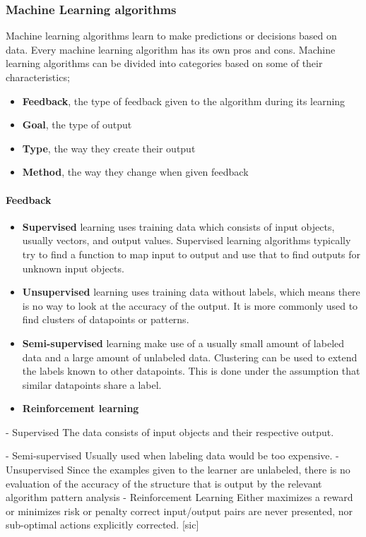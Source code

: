 \subsubsection{Machine Learning algorithms}
Machine learning algorithms learn to make predictions or decisions based on data. Every machine learning algorithm has its own pros and cons. Machine learning algorithms can be divided into categories based on some of their characteristics;
\begin{itemize}
	\item \textbf{Feedback}, the type of feedback given to the algorithm during its learning
	\item \textbf{Goal}, the type of output
	\item \textbf{Type}, the way they create their output
	\item \textbf{Method}, the way they change when given feedback
\end{itemize}

\paragraph{Feedback}
\begin{itemize}
	\item \textbf{Supervised}
		learning uses training data which consists of input objects, usually vectors, and output values. Supervised learning algorithms typically try to find a function to map input to output and use that to find outputs for unknown input objects.
	\item \textbf{Unsupervised}
		learning uses training data without labels, which means there is no way to look at the accuracy of the output. It is more commonly used to find clusters of datapoints or patterns.
	\item \textbf{Semi-supervised}
		learning make use of a usually small amount of labeled data and a large amount of unlabeled data. Clustering can be used to extend the labels known to other datapoints. This is done under the assumption that similar datapoints share a label.
	\item \textbf{Reinforcement learning}
		
\end{itemize}
- Supervised
	The data consists of input objects and their respective output.
	
- Semi-supervised
	Usually used when labeling data would be too expensive.
- Unsupervised
	 Since the examples given to the learner are unlabeled, there is no evaluation of the accuracy of the structure that is output by the relevant algorithm
	 pattern analysis
- Reinforcement Learning
	Either maximizes a reward or minimizes risk or penalty
	correct input/output pairs are never presented, nor sub-optimal actions explicitly corrected. [sic]

